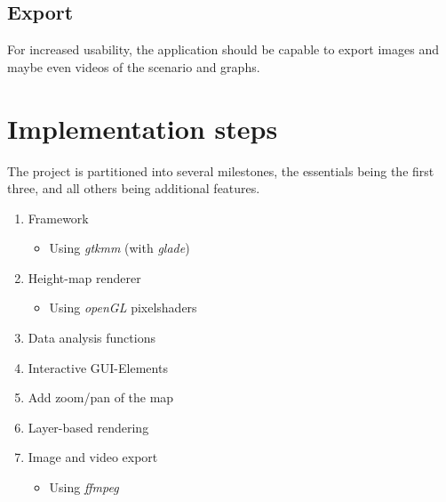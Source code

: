 \documentclass[paper=a4]{proc}
\begin{document}
		\subsection{Export}
			For increased usability, the application should be capable to export images and maybe even videos of the scenario and graphs.
	\section{Implementation steps}
		The project is partitioned into several milestones, the essentials being the first three, and all others being additional features.
		\begin{enumerate}
			\item Framework
			\begin{itemize}
				\item Using \emph{gtkmm} (with \emph{glade})
			\end{itemize}
			\item Height-map renderer
			\begin{itemize}
				\item Using \emph{openGL} pixelshaders
			\end{itemize}
			\item Data analysis functions
			\item Interactive GUI-Elements
			\item Add zoom/pan of the map
			\item Layer-based rendering
			\item Image and video export
			\begin{itemize}
				\item Using \emph{ffmpeg}
			\end{itemize}
		\end{enumerate}
\end{document}
